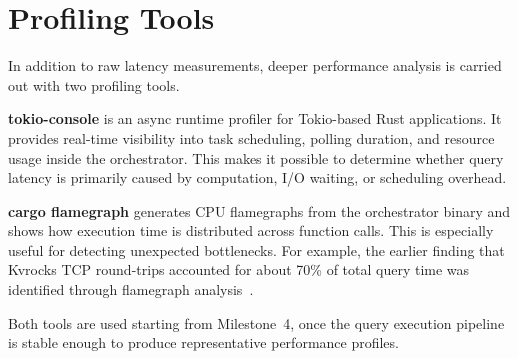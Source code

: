 \section{Profiling Tools}

In addition to raw latency measurements, deeper performance analysis is carried out with two profiling tools.

\textbf{tokio-console} is an async runtime profiler for Tokio-based Rust applications. It provides real-time visibility into task scheduling, polling duration, and resource usage inside the orchestrator. This makes it possible to determine whether query latency is primarily caused by computation, I/O waiting, or scheduling overhead.

\textbf{cargo flamegraph} generates CPU flamegraphs from the orchestrator binary and shows how execution time is distributed across function calls. This is especially useful for detecting unexpected bottlenecks. For example, the earlier finding that Kvrocks TCP round-trips accounted for about 70\% of total query time was identified through flamegraph analysis~\cite{luo2019}.

Both tools are used starting from Milestone~4, once the query execution pipeline is stable enough to produce representative performance profiles.

